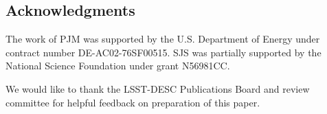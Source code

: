 \documentclass[\docopts]{\docclass}
\begin{document}
\subsection*{Acknowledgments}


The work of PJM was supported by the U.S. Department of Energy under contract 
number DE-AC02-76SF00515.
SJS was partially supported by the National Science Foundation under grant 
N56981CC.



We would like to thank the LSST-DESC Publications Board and review committee 
for helpful feedback on preparation of this paper.





\end{document}
